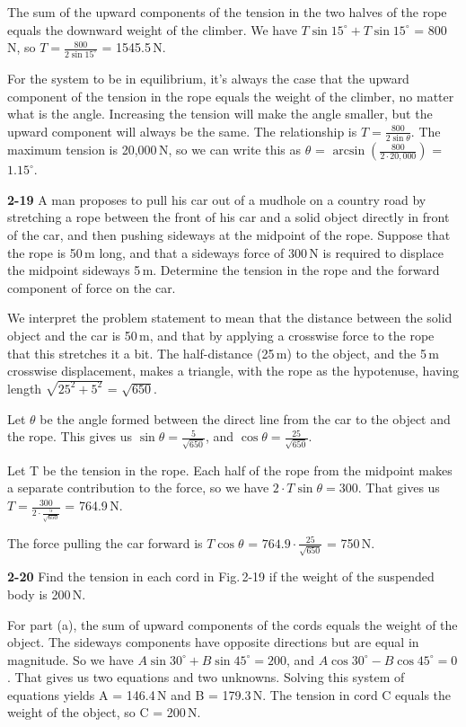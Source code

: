 \documentclass{amsart}
\begin{document}
The sum of the upward components of the tension in the two halves of the rope equals the downward
weight of the climber.  We have $T \sin 15^\circ + T \sin 15^\circ$ = 800\,N,
so $T = \frac{800}{2 \sin 15^\circ}$ = 1545.5\,N.

For the system to be in equilibrium, it's always the case that the upward component of the tension
in the rope equals the weight of the climber, no matter what is the angle.
Increasing the tension will make the angle smaller, but the upward component will always be the same.
The relationship is $T = \frac{800}{2 \sin \theta}$.
The maximum tension is 20,000\,N, so we can write this as
$\theta$ = $\arcsin(\frac{800}{2 \cdot 20,000})$ = $1.15^\circ$.

\vspace{\baselineskip}
\noindent
\textbf{2-19} A man proposes to pull his car out of a mudhole on a country road by stretching a rope
between the front of his car and a solid object directly in front of the car, and then pushing sideways
at the midpoint of the rope.
Suppose that the rope is 50\,m long, and that a sideways force of 300\,N is required to displace
the midpoint sideways 5\,m.
Determine the tension in the rope and the forward component of force on the car.

We interpret the problem statement to mean that the distance between the solid object and the car
is 50\,m, and that by applying a crosswise force to the rope that this stretches it a bit.
The half-distance (25\,m) to the object, and the 5\,m crosswise displacement, makes a triangle,
with the rope as the hypotenuse, having length $\sqrt{25^2 + 5^2}$ = $\sqrt{650}$.

Let $\theta$ be the angle formed between the direct line from the car to the object and the rope.
This gives us $\sin \theta = \frac{5}{\sqrt{650}}$, and $\cos \theta = \frac{25}{\sqrt{650}}$.

Let T be the tension in the rope.
Each half of the rope from the midpoint makes a separate contribution to the force,
so we have $2 \cdot T \sin \theta = 300$.
That gives us $T = \frac{300}{2 \cdot \frac{5}{\sqrt{650}}}$ = 764.9\,N.

The force pulling the car forward is $T \cos \theta$ = $764.9 \cdot \frac{25}{\sqrt{650}}$ = 750\,N.

\vspace{\baselineskip}
\noindent
\textbf{2-20} Find the tension in each cord in Fig.\,2-19 if the weight of the
suspended body is 200\,N.

For part (a), the sum of upward components of the cords equals the weight of the object.
The sideways components have opposite directions but are equal in magnitude.
So we have $A \sin 30^\circ + B \sin 45^\circ = 200$, and
$A \cos 30^\circ - B \cos 45^\circ = 0$.
That gives us two equations and two unknowns.
Solving this system of equations yields A = 146.4\,N and B = 179.3\,N.
The tension in cord C equals the weight of the object, so C = 200\,N.
\end{document}
